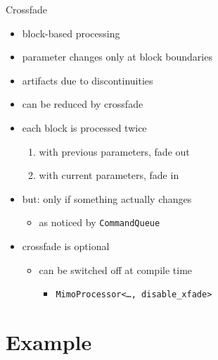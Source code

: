 \documentclass{beamer}
\newcommand{\code}{\texttt}
\begin{document}
\begin{frame}{Crossfade}
\begin{itemize}
\item block-based processing
\item parameter changes only at block boundaries
\item artifacts due to discontinuities
\item can be reduced by crossfade
\end{itemize}
\pause

\begin{itemize}
\item each block is processed twice
\begin{enumerate}
\item with previous parameters, fade out
\item with current parameters, fade in
\end{enumerate}
\item but: only if something actually changes
\begin{itemize}
\item as noticed by \code{CommandQueue}
\end{itemize}
\item crossfade is optional
\begin{itemize}
\item can be switched off at compile time
\begin{itemize}
\item \code{MimoProcessor<\dots, disable\_xfade>}
\end{itemize}
\end{itemize}
\end{itemize}
\end{frame}

\section{Example}
\end{document}
